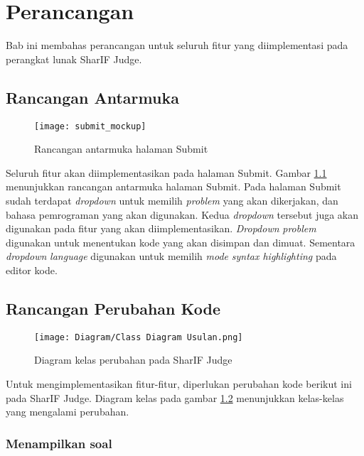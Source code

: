 \chapter{Perancangan}
\label{chap:perancangan}

Bab ini membahas perancangan untuk seluruh fitur yang diimplementasi pada  perangkat lunak SharIF Judge.

\section{Rancangan Antarmuka}
\label{sec:4:antarmuka}

\begin{figure}[H]
	\centering  
	\texttt{[image: submit\_mockup]}  
	\caption{Rancangan antarmuka halaman Submit} 
	\label{fig:4:antarmuka} 
\end{figure} 

Seluruh fitur akan diimplementasikan pada halaman Submit. Gambar \ref{fig:4:antarmuka} menunjukkan rancangan antarmuka halaman Submit. Pada halaman Submit sudah terdapat \textit{dropdown} untuk memilih \textit{problem} yang akan dikerjakan, dan bahasa pemrograman yang akan digunakan. Kedua \textit{dropdown} tersebut juga akan digunakan pada fitur yang akan diimplementasikan. \textit{Dropdown} \textit{problem} digunakan untuk menentukan kode yang akan disimpan dan dimuat. Sementara \textit{dropdown} \textit{language} digunakan untuk memilih \textit{mode} \textit{syntax highlighting} pada editor kode.

\section{Rancangan Perubahan Kode}
\label{sec:4:kode}

\begin{figure}[H]
	\centering  
	\texttt{[image: Diagram/Class Diagram Usulan.png]}  
	\caption{Diagram kelas perubahan pada SharIF Judge} 
	\label{fig:4:classdiagram} 
\end{figure} 

Untuk mengimplementasikan fitur-fitur, diperlukan perubahan kode berikut ini pada SharIF Judge. Diagram kelas pada gambar \ref{fig:4:classdiagram} menunjukkan kelas-kelas yang mengalami perubahan.

\subsection{Menampilkan soal}
\label{subsec:4:soal}

